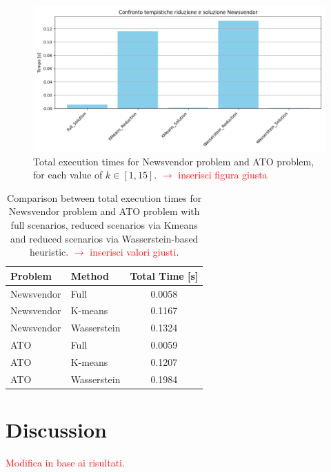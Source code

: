 \documentclass[a4paper,12pt]{article}
\begin{document}
	\begin{figure}[H]
		\centering
		\includegraphics[width=1\textwidth]{../immagini/tempiNV.png}
		\caption{Total execution times for Newsvendor problem and ATO problem, for each value of $k \in [1,15]$. \textcolor{red}{$\rightarrow$ inserisci figura giusta}}
		\label{fig:timing}
	\end{figure}
	
\begin{table}[htbp]
	\centering
		\begin{tabular}{|l|l|c|}
		\hline
		\textbf{Problem} & \textbf{Method} & \textbf{Total Time [s]} \\
		\hline
		Newsvendor & Full           & 0.0058 \\
		Newsvendor & K-means        & 0.1167 \\
		Newsvendor & Wasserstein    & 0.1324 \\
		\hline
		ATO        & Full           & 0.0059 \\
		ATO        & K-means        & 0.1207 \\
		ATO        & Wasserstein    & 0.1984 \\
		\hline
	\end{tabular}
	\label{tab:summary-times}
		\caption{Comparison between total execution times for Newsvendor problem and ATO problem with full scenarios, reduced scenarios via Kmeans and reduced scenarios via Wasserstein-based heuristic. \textcolor{red}{$\rightarrow$ inserisci valori giusti}.}
	
\end{table}
			
	\newpage
	
	\section{Discussion}
	
	\textcolor{red}{Modifica in base ai risultati.}\\
	
\end{document}
